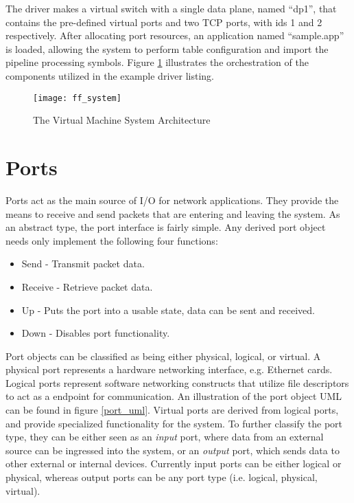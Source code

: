 The driver makes a virtual switch with a single data plane, named ``dp1'', that
contains the pre-defined virtual ports and two TCP ports, with ids 1 and 2
respectively. After allocating port resources, an application named
``sample.app'' is loaded, allowing the system to perform table configuration
and import the pipeline processing symbols. Figure \ref{ff_system} illustrates
the orchestration of the components utilized in the example driver listing.

\begin{figure}[h]
\centering
\texttt{[image: ff\_system]}
\caption{The Virtual Machine System Architecture}
\label{ff_system}
\end{figure}

\section{Ports}
\label{vm:port}
Ports act as the main source of I/O for network applications. They provide the
means to receive and send packets that are entering and leaving the system. As
an abstract type, the port interface is fairly simple. Any derived port object
needs only implement the following four functions:

\begin{itemize}
\item Send - Transmit packet data.
\item Receive - Retrieve packet data.
\item Up - Puts the port into a usable state, data can be sent and received.
\item Down - Disables port functionality.
\end{itemize}

Port objects can be classified as being either physical, logical, or virtual. A
physical port represents a hardware networking interface, e.g. Ethernet cards.
Logical ports represent software networking constructs that utilize file
descriptors to act as a endpoint for communication. An illustration of the port
object UML can be found in figure \ref{port_uml}. Virtual ports are derived
from logical ports, and provide specialized functionality for the system. To
further classify the port type, they can be either seen as an \emph{input}
port, where data from an external source can be ingressed into the system, or an
\emph{output} port, which sends data to other external or internal devices.
Currently input ports can be either logical or physical, whereas output ports
can be any port type (i.e. logical, physical, virtual).

